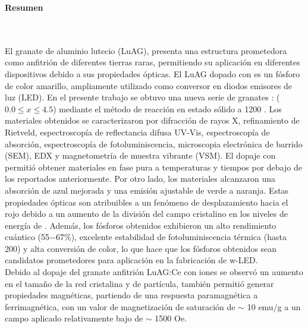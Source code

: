 \newpage
\textbf{\LARGE Resumen}
{}\\\\

El granate de aluminio lutecio (LuAG), presenta una estructura prometedora como
anfitrión de diferentes tierras raras, permitiendo su aplicación en diferentes
dispositivos debido a sus propiedades ópticas. El LuAG dopado con  es
un fósforo de color amarillo, ampliamente utilizado como conversor en diodos emisores
de luz (LED). En el presente trabajo se obtuvo una nueva serie de granates 
: ($0.0 \leq x \leq 4.5$)
mediante el método de reacción en estado sólido a 1200 \textcelsius. Los
materiales
obtenidos se caracterizaron por difracción de rayos X, refinamiento de
Rietveld, espectroscopía de reflectancia difusa UV-Vis, espectroscopía de
absorción, espectroscopía de fotoluminiscencia, microscopia electrónica de
barrido (SEM),
EDX y magnetometría de muestra vibrante (VSM). El dopaje con 
permitió
obtener materiales en fase pura a temperaturas y tiempos por debajo de los
reportados anteriormente. Por otro lado, los materiales alcanzaron una
absorción
de azul mejorada y una emisión ajustable de verde a naranja. Estas
propiedades ópticas son atribuibles a un fenómeno de desplazamiento hacia el
rojo debido a un aumento de la división del campo cristalino en los niveles de
energía de . Además, los fósforos obtenidos exhibieron un alto
rendimiento
cuántico (55$-$67\%), excelente estabilidad de fotoluminiscencia térmica (hasta
200\textcelsius) y alta conversión de color, lo que hace que los fósforos
obtenidos
sean candidatos prometedores para aplicación en la fabricación de w-LED.\\

Debido al dopaje del granate anfitrión LuAG:Ce con iones  se
observó un
aumento en el tamaño de la red cristalina y de partícula, también permitió
generar propiedades magnéticas,
partiendo de una respuesta paramagnética a ferrimagnética, con un valor de
magnetización de saturación de $\sim$
10 emu/g a un campo aplicado relativamente bajo de $\sim$ 1500 Oe.


